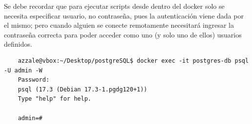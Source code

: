 \documentclass{article}
\begin{document}
Se debe recordar que para ejecutar scripts desde dentro del docker solo se necesita especificar usuario, no contraseña, pues la autenticación viene dada por el mismo; pero cuando alguien se conecte remotamente necesitará ingresar la contraseña correcta para poder acceder como uno (y solo uno de ellos) usuarios definidos.


\begin{tcolorbox}[colback=black, coltext=white, fontupper=\ttfamily, title=Terminal]
\begin{verbatim}
    azzale@vbox:~/Desktop/postgreSQL$ docker exec -it postgres-db psql -U admin -W
    Password: 
    psql (17.3 (Debian 17.3-1.pgdg120+1))
    Type "help" for help.

    admin=# 
\end{verbatim}
\end{tcolorbox}
\end{document}
